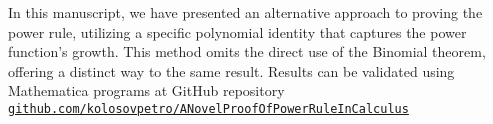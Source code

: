 In this manuscript, we have presented an alternative approach to proving the power rule, utilizing a specific polynomial
identity that captures the power function's growth.
This method omits the direct use of the Binomial theorem, offering a distinct way to the same result.
Results can be validated using Mathematica programs at GitHub repository
\href{https://github.com/kolosovpetro/ANovelProofOfPowerRuleInCalculus}
{\texttt{github.com/kolosovpetro/ANovelProofOfPowerRuleInCalculus}}
